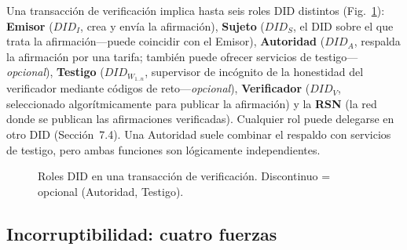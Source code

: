 \documentclass[11pt,a4paper,twocolumn]{article}
\begin{document}
Una transacción de verificación implica hasta seis roles DID distintos (Fig.~\ref{fig:roles}): \textbf{Emisor} ($DID_I$, crea y envía la afirmación), \textbf{Sujeto} ($DID_S$, el DID sobre el que trata la afirmación---puede coincidir con el Emisor), \textbf{Autoridad} ($DID_A$, respalda la afirmación por una tarifa; también puede ofrecer servicios de testigo---\emph{opcional}), \textbf{Testigo} ($DID_{W_{1..n}}$, supervisor de incógnito de la honestidad del verificador mediante códigos de reto---\emph{opcional}), \textbf{Verificador} ($DID_V$, seleccionado algorítmicamente para publicar la afirmación) y la \textbf{RSN} (la red donde se publican las afirmaciones verificadas). Cualquier rol puede delegarse en otro DID (Sección~7.4). Una Autoridad suele combinar el respaldo con servicios de testigo, pero ambas funciones son lógicamente independientes.

\begin{figure}[ht]
\centering
{}
\caption{Roles DID en una transacción de verificación. Discontinuo = opcional (Autoridad, Testigo).}
\label{fig:roles}
\end{figure}

\subsection{Incorruptibilidad: cuatro fuerzas}
\end{document}
